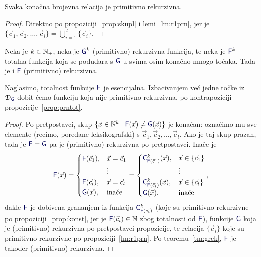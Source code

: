 \begin{korolar}[{name=[primitivna rekurzivnost konačnih relacija]}]\label{kor:konprn}
Svaka konačna brojevna relacija je primitivno rekurzivna.
\end{korolar}
\begin{proof}
Direktno po propoziciji~\ref{prop:skupl} i lemi~\ref{lm:r1prn}, jer je $\{\vec c_1,\vec c_2,\dotsc,\vec c_l\}=\bigcup_{i=1}^{\,l}\{\vec c_i\}$.
\end{proof}

\begin{propozicija}[{name=[{teorem o editiranju za totalne funkcije}]}]\label{prop:konprom}
Neka je $k\in{\mathbb N}_+$, neka je $\f G^k$ (primitivno) rekurzivna funkcija, te neka je $\f F^k$ totalna funkcija koja se podudara s $\f G$ u svima osim konačno mnogo točaka. Tada je i $\f F$ (primitivno) rekurzivna.
\end{propozicija}
Naglasimo, totalnost funkcije $\f F$ je esencijalna. Izbacivanjem već jedne točke iz $\dom{\f G}$ dobit ćemo funkciju koja nije primitivno rekurzivna, po kontrapoziciji propozicije~\ref{prop:prntot}.
\begin{proof}
    Po pretpostavci, skup $\{\vec x\in\N^k\mid\f F(\vec x)\not=\f G(\vec x)\}$ je konačan: označimo mu sve elemente (recimo, poredane leksikografski) s $\vec c_1,\vec c_2,\dotsc,\vec c_l$. Ako je taj skup prazan, tada je $\f F=\f G$ pa je (primitivno) rekurzivna po pretpostavci. Inače je
\begin{equation}
    \f F(\vec x)=\begin{cases}
    \f F(\vec c_1),&\vec x=\vec c_1\\
    &\vdots\\
    \f F(\vec c_l),&\vec x=\vec c_l\\
    \f G(\vec x),&\text{inače}
    \end{cases}=\begin{cases}
    \f C^k_{\f F(\vec c_1)}(\vec x),&\vec x\in\{\vec c_1\}\\
    &\vdots\\
    \f C^k_{\f F(\vec c_l)}(\vec x),&\vec x\in\{\vec c_l\}\\
    \f G(\vec x),&\text{inače}
    \end{cases}\text,
\end{equation}
dakle $\f F$ je dobivena grananjem iz funkcija $\f C^k_{\f F(\vec c_i)}$ (koje su primitivno rekurzivne po propoziciji~\ref{prop:konst}, jer je $\f F(\vec c_i)\in\N$ zbog totalnosti od $\f F$), funkcije $\f G$ koja je (primitivno) rekurzivna po pretpostavci propozicije, te relacija $\{\vec c_i\}$ koje su primitivno rekurzivne po propoziciji~\ref{lm:r1prn}. Po teoremu~\ref{tm:grek}, $\f F$ je također (primitivno) rekurzivna.
\end{proof}

